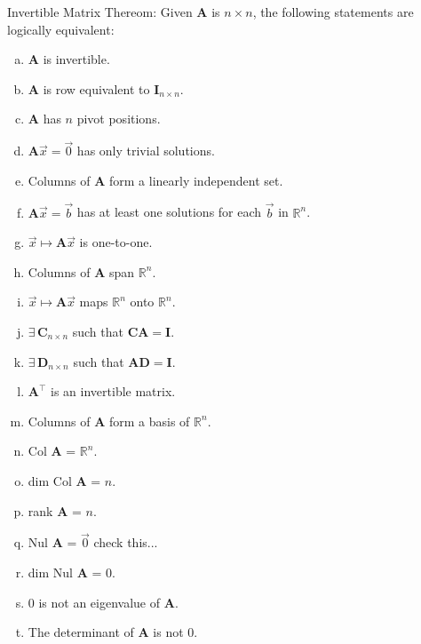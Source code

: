 \documentclass[11pt]{article}
\newcommand{\R}{\mathbb{R}}
\newcommand{\A}{\mathbf{A}}
\newcommand{\I}{\mathbf{I}}
\begin{document}
\noindent {} Invertible Matrix Thereom: Given $\A$ is $n \times n$, the following statements are logically equivalent:
\begin{enumerate} [a)]
  \item $\A$ is invertible.
  \item $\A$ is row equivalent to $\I_{n \times n}$.
  \item $\A$ has $n$ pivot positions.
  \item $\A \vec{x} = \vec{0}$ has only trivial solutions.
  \item Columns of $\A$ form a linearly independent set.
  \item $\A \vec{x} = \vec{b}$ has at least one solutions for each $\vec{b}$ in $\R^n$.
  \item $\vec{x} \mapsto \A \vec{x}$ is one-to-one.
  \item Columns of $\A$ span $\R^n$.
  \item $\vec{x} \mapsto \A \vec{x}$ maps $\R^n$ onto $\R^n$.
  \item $\exists \, \mathbf{C}_{n \times n}$ such that $\mathbf{C} \A = \I$.
  \item $\exists \, \mathbf{D}_{n \times n}$ such that $\A \mathbf{D} = \I$.
  \item $\A^\intercal$ is an invertible matrix.
  \item Columns of $\A$ form a basis of $\R^n$.
  \item Col $\A$ = $\R^n$.
  \item dim Col $\A$ = $n$.
  \item rank $\A$ = $n$.
  \item Nul $\A$ = ${\vec{0}}$ check this...
  \item dim Nul $\A$ = 0.
  \item 0 is not an eigenvalue of $\A$.
  \item The determinant of $\A$ is not 0.
\end{enumerate}
\end{document}
